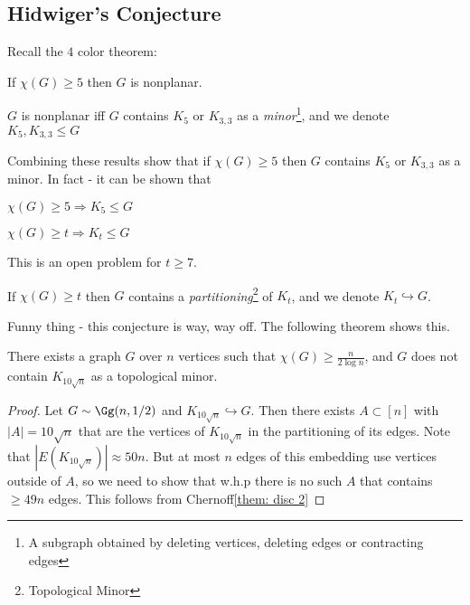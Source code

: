 \documentclass[a4paper, 11pt, oneside]{book}
\begin{document}
\subsection{Hidwiger's Conjecture}
Recall the $4$ color theorem: 
\begin{thm}\label{thm:4color}
	If $\chi(G)\ge 5$ then $G$ is nonplanar.
\end{thm}
\begin{thm}
	[Wagner]\label{thm: Wagner}
	$G$ is nonplanar iff $G$ contains $K_5$ or $K_{3,3}$ as a \emph{minor}\footnote{A subgraph obtained by deleting vertices, deleting edges or contracting edges}, and we denote $K_5,K_{3,3}\le G$
\end{thm}
Combining these results show that if $\chi(G)\ge 5$ then $G$ contains $K_5$ or $K_{3,3}$ as a minor. In fact - it can be shown that
\begin{thm}
	$\chi(G)\ge 5\Rightarrow K_5\le G$
\end{thm}
\begin{conjecture}
	$\chi(G)\ge t\Rightarrow K_t\le G$
\end{conjecture}
This is an open problem for $t\ge 7$.
\begin{conjecture}
	[Hajos]\label{conj:Hajos} If $\chi(G)\ge t$ then $G$ contains a \emph{partitioning}\footnote{Topological Minor} of $K_t$, and we denote $K_t\hookrightarrow G$.
\end{conjecture}
Funny thing - this conjecture is way, way off. The following theorem shows this.
\begin{thm}
	There exists a graph $G$ over $n$ vertices such that $\chi(G)\ge \frac{n}{2\log n}$, and $G$ does not contain $K_{10\sqrt{n}}$ as a topological minor.
\end{thm}

\begin{proof}
	Let $G\sim \Gg(n,1/2)$ and $K_{10\sqrt{n}}	\hookrightarrow G$. Then there exists $A\subset [n]$ with $|A| = 10\sqrt{n}$ that are the vertices of $K_{10\sqrt{n}}$ in the partitioning of its edges. Note that $|E(K_{10\sqrt{n}})| \approx 50n$. But at most $n$ edges of this embedding use vertices outside of $A$, so we need to show that w.h.p there is no such $A$ that contains $\ge 49n$ edges. This follows from Chernoff\autoref{them: disc 2}
\end{proof}
\end{document}
